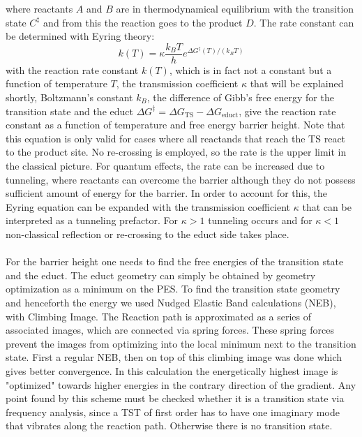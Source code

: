 \documentclass[11pt,DIV=13,BCOR=5mm,a4paper,headinclude]{scrbook}
\begin{document}
where reactants $A$ and $B$ are in thermodynamical equilibrium with the transition state $C^\ddagger$ and from this the reaction goes to the product $D$.
The rate constant can be determined with Eyring theory:
\begin{equation}\label{eq:eyring}
k(T)=\kappa\frac{k_BT}{h}e^{\Delta G^\ddagger(T)/(k_BT)}
\end{equation}
with the reaction rate constant $k(T)$, which is in fact not a constant but a function of temperature $T$, the transmission coefficient $\kappa$ that will be explained shortly, Boltzmann's constant $k_B$, the difference of Gibb's free energy for the transition state and the educt $\Delta G^\ddagger = \Delta G_\textrm{TS} - \Delta G_\textrm{educt}$, give the reaction rate constant as a function of temperature and free energy barrier height.
Note that this equation is only valid for cases where all reactands that reach the TS react to the product site.
No re-crossing is employed, so the rate is the upper limit in the classical picture.
For quantum effects, the rate can be increased due to tunneling, where reactants can overcome the barrier although they do not possess sufficient amount of energy for the barrier.
In order to account for this, the Eyring equation can be expanded with the transmission coefficient $\kappa$ that can be interpreted as a tunneling prefactor.
For $\kappa>1$ tunneling occurs and for $\kappa<1$ non-classical reflection or re-crossing to the educt side takes place.
\\\\
For the barrier height one needs to find the free energies of the transition state and the educt.
The educt geometry can simply be obtained by geometry optimization as a minimum on the PES.
To find the transition state geometry and henceforth the energy we used Nudged Elastic Band calculations (NEB), with Climbing Image.
The Reaction path is approximated as a series of associated images, which are connected via spring forces.
These spring forces prevent the images from optimizing into the local minimum next to the transition state.
First a regular NEB, then on top of this climbing image was done which gives better convergence.
In this calculation the energetically highest image is "optimized" towards higher energies in the contrary direction of the gradient.
Any point found by this scheme must be checked whether it is a transition state via frequency analysis, since a TST of first order has to have one imaginary mode that vibrates along the reaction path.
Otherwise there is no transition state.
\end{document}
